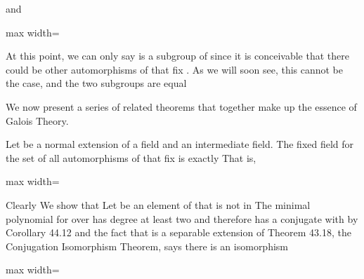 \documentclass[11pt,oneside]{article}
\begin{document}
\begin{BookBody}
\noindent and

\begin{center}\begin{adjustbox}{max width=\linewidth}\end{adjustbox}\end{center}

At this point, we can only say \BookInline{\langle \sigma \rangle } is a subgroup of  since it is conceivable that there could be other automorphisms of  that fix . As we will soon see, this cannot be the case, and the two subgroups are equal\BookEnd{\blacktriangle}

We now present a series of related theorems that together make up the essence of Galois Theory.

 Let  be a normal extension of a field  and  an intermediate field. The fixed field for the set of all automorphisms of  that fix  is exactly  That is,

\begin{center}\begin{adjustbox}{max width=\linewidth}\end{adjustbox}\end{center}

 Clearly  We show that  Let \BookInline{\alpha } be an element of  that is not in  The minimal polynomial for \BookInline{\alpha } over  has degree at least two and therefore \BookInline{\alpha } has a conjugate  with \BookInline{\beta \neq \alpha,\allowbreak } by Corollary 44.12 and the fact that  is a separable extension of  Theorem 43.18, the Conjugation Isomorphism Theorem, says there is an isomorphism

\begin{center}\begin{adjustbox}{max width=\linewidth}\end{adjustbox}\end{center}


\end{BookBody}
\end{document}
